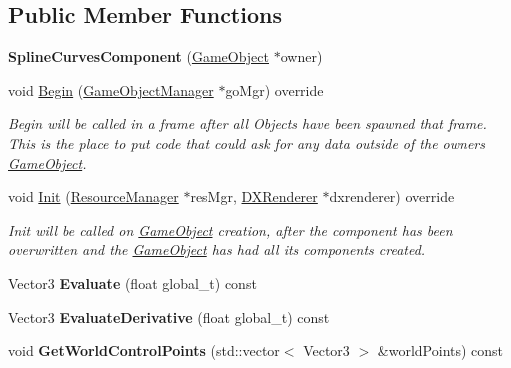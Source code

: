 \subsection*{Public Member Functions}
\begin{DoxyCompactItemize}
\item 
\mbox{\label{classSplineCurvesComponent_a3aa898ed46fd1a0a264b5740a5b0aba6}} 
{\bfseries Spline\+Curves\+Component} (\hyperlink{classGameObject}{Game\+Object} $\ast$owner)
\item 
void \hyperlink{classSplineCurvesComponent_abe3105f9717c863725a4cfb84b63383a}{Begin} (\hyperlink{classGameObjectManager}{Game\+Object\+Manager} $\ast$go\+Mgr) override
\begin{DoxyCompactList}\small\item\em Begin will be called in a frame after all Objects have been spawned that frame. This is the place to put code that could ask for any data outside of the owner\textquotesingle{}s \hyperlink{classGameObject}{Game\+Object}. \end{DoxyCompactList}\item 
void \hyperlink{classSplineCurvesComponent_ac6d31d7ca12412c0a35065a77ea956a6}{Init} (\hyperlink{classResourceManager}{Resource\+Manager} $\ast$res\+Mgr, \hyperlink{classDXRenderer}{D\+X\+Renderer} $\ast$dxrenderer) override
\begin{DoxyCompactList}\small\item\em Init will be called on \hyperlink{classGameObject}{Game\+Object} creation, after the component has been overwritten and the \hyperlink{classGameObject}{Game\+Object} has had all its components created. \end{DoxyCompactList}\item 
\mbox{\label{classSplineCurvesComponent_a39898f49e1a4a383ef1c1f2c2788bf66}} 
Vector3 {\bfseries Evaluate} (float global\+\_\+t) const
\item 
\mbox{\label{classSplineCurvesComponent_af5dd6865e9872d9a5c16d97ff0e0a30f}} 
Vector3 {\bfseries Evaluate\+Derivative} (float global\+\_\+t) const
\item 
\mbox{\label{classSplineCurvesComponent_a97cc01ff485ce7499b55198bf35aff9a}} 
void {\bfseries Get\+World\+Control\+Points} (std\+::vector$<$ Vector3 $>$ \&world\+Points) const

\end{DoxyCompactItemize}
